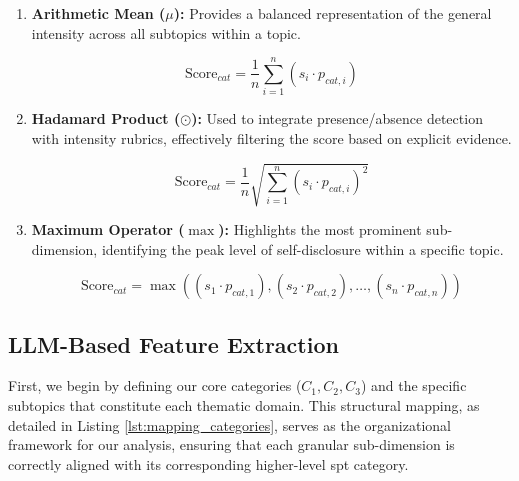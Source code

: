 \begin{enumerate}
\item \textbf{Arithmetic Mean ($\mu$):} Provides a balanced representation of the general intensity across all subtopics within a topic. 

\[
\text{Score}_{cat} = \frac{1}{n} \sum_{i=1}^{n} (s_i \cdot p_{cat,i})
\label{eq:hadamard}
\]

\item \textbf{Hadamard Product ($\odot$):} Used to integrate presence/absence detection with intensity rubrics, effectively filtering the score based on explicit evidence.

\[
\text{Score}_{cat} = \frac{1}{n}\sqrt{\sum_{i=1}^{n} (s_i \cdot p_{cat,i})^2} 
\]


\item \textbf{Maximum Operator ($\max$):} Highlights the most prominent sub-dimension, identifying the peak level of self-disclosure within a specific topic.

\[
\text{Score}_{cat} = \max((s_1 \cdot p_{cat,1}),(s_2 \cdot p_{cat,2}), \dots, (s_n \cdot p_{cat,n}))
\]

\end{enumerate}


































\subsection{LLM-Based Feature Extraction}

First, we begin by defining our core categories ($C_1, C_2, C_3$) and the specific subtopics that constitute each thematic domain. This structural mapping, as detailed in Listing \ref{lst:mapping_categories}, serves as the organizational framework for our analysis, ensuring that each granular sub-dimension is correctly aligned with its corresponding higher-level \gls{spt} category.


